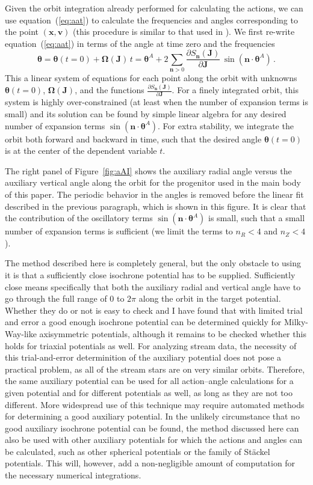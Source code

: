 \documentclass[12pt,preprint]{aastex}
\newcommand{\eqnname}{equation}
\newcommand{\equationname}{\eqnname}
\renewcommand{\figurename}{Figure}
\renewcommand{\vec}[1]{\ensuremath{\mathbf{#1}}}
\newcommand{\vecx}{\ensuremath{\vec{x}}}
\newcommand{\vecv}{\ensuremath{\vec{v}}}
\newcommand{\vecj}{\ensuremath{\vec{J}}}
\newcommand{\vecn}{\ensuremath{\vec{n}}}
\newcommand{\veco}{\ensuremath{\vec{\Omega}}}
\newcommand{\veca}{\ensuremath{\boldsymbol\theta}}
\begin{document}
Given the orbit integration already performed for calculating the
actions, we can use \equationname~(\ref{eq:aat}) to calculate the
frequencies and angles corresponding to the point $(\vecx,\vecv)$
(this procedure is similar to that used in \citealt{McMillan08a}). We
first re-write \equationname~(\ref{eq:aat}) in terms of the angle at
time zero and the frequencies
\begin{equation}\label{eq:aat2}
  \veca = \veca(t=0) + \veco(\vecj) \,t = \veca^A +2\sum_{\vecn > 0} \frac{\partial S_{\vecn}(\vecj)}{\partial \vecj}\,\sin(\vecn\cdot\veca^A)\,.
\end{equation}
This a linear system of equations for each point along the orbit with
unknowns $\veca(t=0)$, $\veco(\vecj)$, and the functions
$\frac{\partial S_{\vecn}(\vecj)}{\partial \vecj}$. For a finely
integrated orbit, this system is highly over-constrained (at least
when the number of expansion terms is small) and its solution can be
found by simple linear algebra for any desired number of expansion
terms $\sin(\vecn\cdot\veca^A)$. For extra stability, we integrate the
orbit both forward and backward in time, such that the desired angle
$\veca(t=0)$ is at the center of the dependent variable $t$.

The right panel of \figurename~\ref{fig:aAI} shows the auxiliary
radial angle versus the auxiliary vertical angle along the orbit for
the progenitor used in the main body of this paper. The periodic
behavior in the angles is removed before the linear fit described in
the previous paragraph, which is shown in this figure. It is clear
that the contribution of the oscillatory terms
$\sin(\vecn\cdot\veca^A)$ is small, such that a small number of
expansion terms is sufficient (we limit the terms to $n_R < 4$ and
$n_Z < 4$).

The method described here is completely general, but the only obstacle
to using it is that a sufficiently close isochrone potential has to be
supplied. Sufficiently close means specifically that both the
auxiliary radial and vertical angle have to go through the full range
of $0$ to $2\pi$ along the orbit in the target potential. Whether they
do or not is easy to check and I have found that with limited trial
and error a good enough isochrone potential can be determined quickly
for Milky-Way-like axisymmetric potentials, although it remains to be
checked whether this holds for triaxial potentials as well. For
analyzing stream data, the necessity of this trial-and-error
determinition of the auxiliary potential does not pose a practical
problem, as all of the stream stars are on very similar
orbits. Therefore, the same auxiliary potential can be used for all
action--angle calculations for a given potential and for different
potentials as well, as long as they are not too different. More
widespread use of this technique may require automated methods for
determining a good auxiliary potential. In the unlikely circumstance
that no good auxiliary isochrone potential can be found, the method
discussed here can also be used with other auxiliary potentials for
which the actions and angles can be calculated, such as other
spherical potentials or the family of St\"{a}ckel potentials. This
will, however, add a non-negligible amount of computation for the
necessary numerical integrations.
\end{document}
